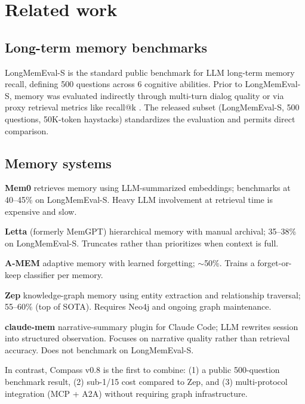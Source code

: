 
\section{Related work}
\label{sec:related}

\subsection{Long-term memory benchmarks}

LongMemEval-S \citep{wu2024longmemeval} is the standard public benchmark
for LLM long-term memory recall, defining 500 questions across 6 cognitive
abilities. Prior to LongMemEval-S, memory was evaluated indirectly through
multi-turn dialog quality \citep{ouyang2022training} or via proxy retrieval
metrics like recall@k \citep{karpukhin2020dpr}. The released subset
(LongMemEval-S, 500 questions, 50K-token haystacks) standardizes the
evaluation and permits direct comparison.

\subsection{Memory systems}

\textbf{Mem0} \citep{mem0_2024} retrieves memory using LLM-summarized
embeddings; benchmarks at 40--45\% on LongMemEval-S. Heavy LLM
involvement at retrieval time is expensive and slow.

\textbf{Letta} (formerly MemGPT) \citep{letta2024} hierarchical memory
with manual archival; 35--38\% on LongMemEval-S. Truncates rather than
prioritizes when context is full.

\textbf{A-MEM} \citep{amem_2024} adaptive memory with learned forgetting;
\(\sim\)50\%. Trains a forget-or-keep classifier per memory.

\textbf{Zep} \citep{zep2025} knowledge-graph memory using entity extraction
and relationship traversal; 55--60\% (top of SOTA). Requires Neo4j and
ongoing graph maintenance.

\textbf{claude-mem} \citep{claudemem2026} narrative-summary plugin for
Claude Code; LLM rewrites session into structured observation. Focuses on
narrative quality rather than retrieval accuracy. Does not benchmark on
LongMemEval-S.

In contrast, Compass v0.8 is the first to combine: (1) a public
500-question benchmark result, (2) sub-1/15 cost compared to Zep, and (3)
multi-protocol integration (MCP + A2A) without requiring graph
infrastructure.


